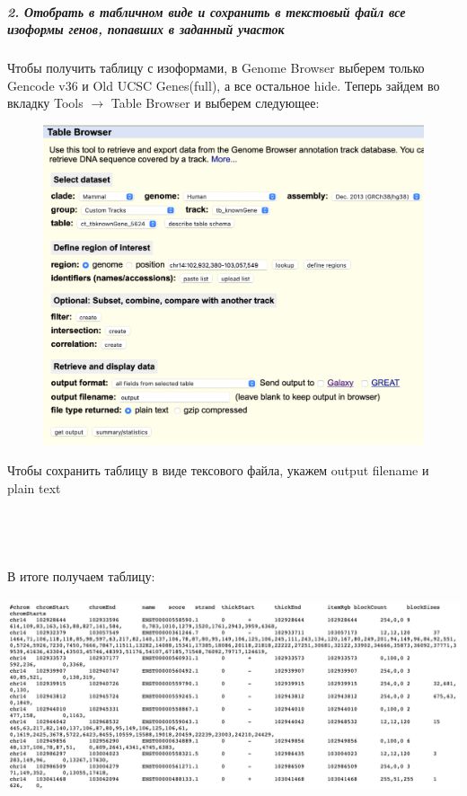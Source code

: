 \documentclass[12pt]{article}
\begin{document}
\subparagraph{2. Отобрать в табличном виде и сохранить в текстовый файл все изоформы генов, попавших в заданный участок\\}
Чтобы получить таблицу с изоформами, в Genome Browser выберем только Gencode v36 и Old UCSC Genes(full), а все остальное hide. Теперь зайдем во вкладку Tools $\rightarrow$ Table Browser и выберем следующее:
\begin{figure}[H]
\centering
\includegraphics[width=15cm]{image/image13.png}
\end{figure}
Чтобы сохранить таблицу в виде тексового файла, укажем output filename и plain text\\\\\\\\\\
В итоге получаем таблицу: \\\\
\includegraphics[width=17cm]{image/image12.png}
\end{document}
